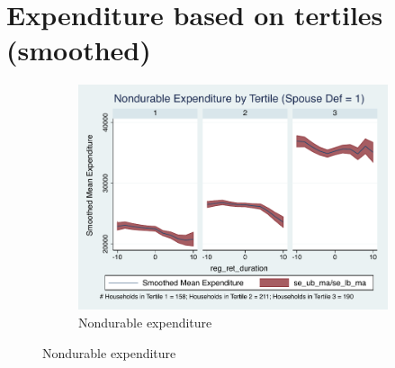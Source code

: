 \documentclass[a4paper]{article}
\begin{document}
\section{Expenditure based on tertiles (smoothed)} 
\begin{figure}[h]
	\caption{Expenditure based on tertile}
	\begin{subfigure}{1.0\textwidth}
		\centering
		\includegraphics[width=0.8\linewidth]{../ConsumptionPostRetirement_by_SpouseDef/Smoothed/spouse_def_1.pdf}
		\caption{Nondurable expenditure}
	\end{subfigure}
	\vspace{1cm}
	

\end{figure}
\end{document}
